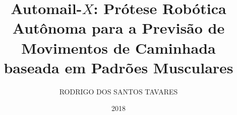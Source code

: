 \documentclass[
    12pt,       %
    oneside,    %
    a4paper,    %
%
    chapter=TITLE,	  	  %
%
    english,			  %
    brazil				  %
%
]{abntex2}
\title{Automail-$X$: Prótese Robótica Autônoma para a Previsão de Movimentos de Caminhada baseada em Padrões Musculares}
\author{RODRIGO DOS SANTOS TAVARES}
\date{2018}
\begin{document}


\imprimircapa{}

\imprimirfolhaderosto{}

\imprimirfolhadeaprovacao{}



\end{document}
